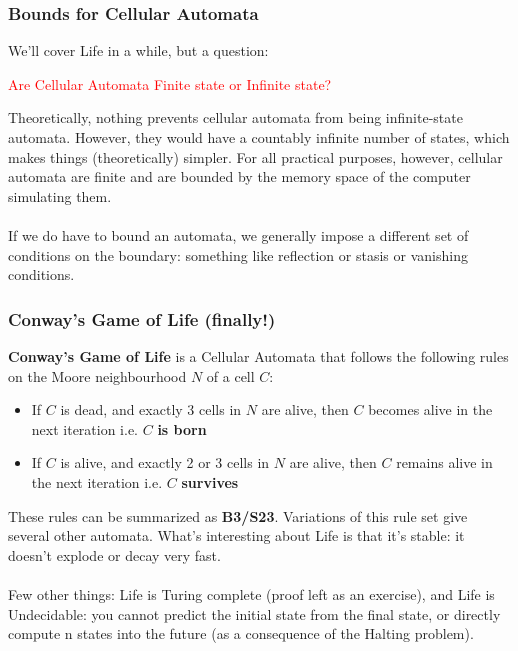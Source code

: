\documentclass[handout]{beamer}
\begin{document}
\begin{frame}
\end{frame}

\begin{frame}
\frametitle{Bounds for Cellular Automata}
\begin{flushleft}

We'll cover Life in a while, but a question: 
\end{flushleft}
\pause
\begin{center}\begin{Large}\textcolor{red}{
Are Cellular Automata Finite state or Infinite state?}
\end{Large}\end{center}
\pause

\begin{flushleft}
Theoretically, nothing prevents cellular automata from being infinite-state
automata. However, they would have a countably infinite number of states,
which makes things (theoretically) simpler. For all practical purposes,
however, cellular automata are finite and are bounded by the memory space of
the computer simulating them. \\~\\
\pause
If we do have to bound an automata, we generally impose a different set of 
conditions on the boundary: something like reflection or stasis or vanishing
conditions.
\end{flushleft}
\end{frame}

\begin{frame}
\frametitle{Conway's Game of Life   {\tiny (finally!)}}
\begin{flushleft}
\textbf{Conway's Game of Life} is a Cellular Automata that follows the following
rules on the Moore neighbourhood $N$ of a cell $C$:
\pause
\begin{itemize}
\item{If $C$ is dead, and exactly 3 cells in $N$ are alive, then $C$ becomes
alive in the next iteration i.e. $C$ \textbf{is born}}
\pause
\item{If $C$ is alive, and exactly 2 or 3 cells in $N$ are alive, then $C$ remains 
alive in the next iteration i.e. $C$ \textbf{survives}}
\end{itemize}
\pause
These rules can be summarized as \textbf{B3/S23}. Variations of this rule set
give several other automata. What's interesting about Life is that it's stable:
it doesn't explode or decay very fast. \\~\\
\pause
Few other things: Life is Turing complete   {\tiny (proof left as an exercise)},
and Life is Undecidable: you cannot predict the initial state from the final
state, or directly compute n states into the future (as a consequence of the 
Halting problem).
\end{flushleft}
\end{frame}
\end{document}
